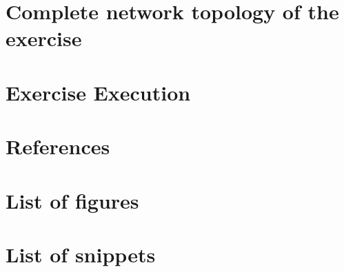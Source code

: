 \documentclass[a4paper]{article}
\begin{document}
\newpage

\section{Complete network topology of the exercise}

\newpage
\section{Exercise Execution}

\newpage
\section{References}

\newpage
\section{List of figures}
\listoffigures
\newpage
\section{List of snippets}
\listoflistings
\end{document}
